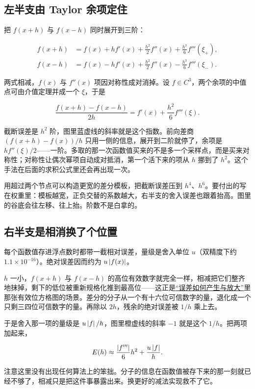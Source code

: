 \subsection{左半支由 Taylor 余项定住}

把 \(f(x+h)\) 与 \(f(x-h)\) 同时展开到三阶：

\[
\begin{aligned}
f(x+h)&=f(x)+hf'(x)+\frac{h^2}{2}f''(x)+\frac{h^3}{6}f'''(\xi_+),\\
f(x-h)&=f(x)-hf'(x)+\frac{h^2}{2}f''(x)-\frac{h^3}{6}f'''(\xi_-).
\end{aligned}
\]

两式相减，\(f(x)\) 与 \(f''(x)\) 项因对称性成对消掉。设 \(f\in C^3\)，两个余项的中值点可由介值定理并成一个 \(\xi\)，于是

\[
\frac{f(x+h)-f(x-h)}{2h}=f'(x)+\frac{h^2}{6}f'''(\xi).
\]

截断误差是 \(h^2\) 阶，图里蓝虚线的斜率就是这个指数。前向差商 \((f(x+h)-f(x))/h\) 只用一侧的信息，展开到二阶就停了，余项是 \(hf''(\xi)/2\)——一阶。多取的那一次函数值买来的不是多一个采样点，而是买来对称性；对称性让偶次幂项自动成对抵消，第一个活下来的项从 \(h\) 挪到了 \(h^2\)。这个手法在后面的求积公式里还会再出现一次。

用超过两个节点可以构造更宽的差分模板，把截断误差压到 \(h^4\)、\(h^6\)。要付出的写在权重里：模板越宽，正负交替的系数越大，右半支的舍入误差也跟着抬高。图里的谷底会往左移、往上抬。阶数不是白拿的。

\subsection{右半支是相消换了个位置}

每个函数值存进浮点数时都带一截相对误差，量级是舍入单位 \(u\)（双精度下约 \(1.1\times10^{-16}\)）。绝对误差因而约为 \(u\left|f(x)\right|\)。

\(h\) 一小，\(f(x+h)\) 与 \(f(x-h)\) 的高位有效数字就完全一样，相减把它们整齐地抹掉，剩下的低位被重新规格化推到最高位——这正是\hyperref[sec:08-Numerical-Analysis/01-Floating-Point-and-Error/02]{``误差如何产生与放大''}里那张有效位方格图的场景。差分的分子从一个有十六位可信数字的量，退化成一个只剩三四位可信数字的量。再除以 \(2h\)，残余的绝对误差被 \(1/h\) 乘上去。

于是舍入那一项的量级是 \(u\left|f\right|/h\)，图里橙虚线的斜率 \(-1\) 就是这个 \(1/h\)。把两项加起来，

\[
E(h)\approx \frac{\left|f'''\right|}{6}h^2+\frac{u\left|f\right|}{h}.
\]

注意这里没有出现任何算法上的笨拙。分子的信息在函数值被存下来的那一刻就已经不够了，相减只是把这件事暴露出来。换更好的减法实现救不了它。

